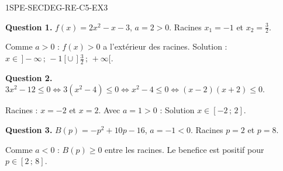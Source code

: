 \begin{corrige}{1SPE-SECDEG-RE-C5-EX3}

\textbf{Question 1.} $f(x) = 2x^2 - x - 3$, $a = 2 > 0$. Racines $x_1 = -1$ et $x_2 = \frac{3}{2}$.

Comme $a > 0$ : $f(x) > 0$ a l'extérieur des racines. Solution : $x \in \,]-\infty\,;\,-1[ \cup \,]\frac{3}{2}\,;\,+\infty[$.

\textbf{Question 2.} $3x^2 - 12 \leq 0 \Leftrightarrow 3(x^2 - 4) \leq 0 \Leftrightarrow x^2 - 4 \leq 0 \Leftrightarrow (x-2)(x+2) \leq 0$.

Racines : $x = -2$ et $x = 2$. Avec $a = 1 > 0$ : Solution $x \in [-2\,;\,2]$.

\textbf{Question 3.} $B(p) = -p^2 + 10p - 16$, $a = -1 < 0$. Racines $p = 2$ et $p = 8$.

Comme $a < 0$ : $B(p) \geq 0$ entre les racines. Le benefice est positif pour $p \in [2\,;\,8]$.

\end{corrige}

